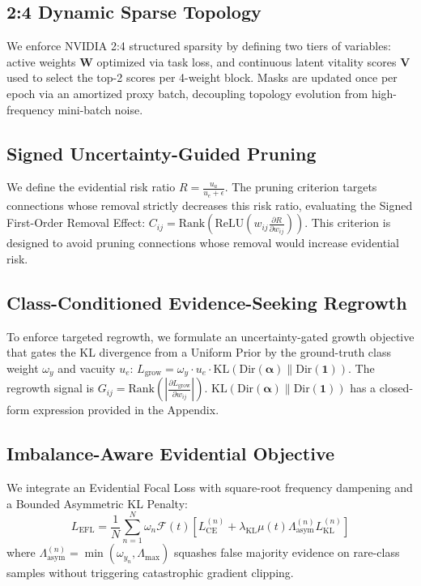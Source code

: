 \documentclass[letterpaper]{article} %
\begin{document}
\subsection{2:4 Dynamic Sparse Topology}
We enforce NVIDIA 2:4 structured sparsity by defining two tiers of variables: active weights $\bm{W}$ optimized via task loss, and continuous latent vitality scores $\bm{V}$ used to select the top-2 scores per 4-weight block. Masks are updated once per epoch via an amortized proxy batch, decoupling topology evolution from high-frequency mini-batch noise.

\subsection{Signed Uncertainty-Guided Pruning}
We define the evidential risk ratio $R = \frac{u_a}{u_e + \epsilon}$. The pruning criterion targets connections whose removal strictly decreases this risk ratio, evaluating the Signed First-Order Removal Effect: $C_{ij} = \text{Rank}(\text{ReLU}(w_{ij} \frac{\partial R}{\partial w_{ij}}))$. This criterion is designed to avoid pruning connections whose removal would increase evidential risk.

\subsection{Class-Conditioned Evidence-Seeking Regrowth}
To enforce targeted regrowth, we formulate an uncertainty-gated growth objective that gates the KL divergence from a Uniform Prior by the ground-truth class weight $\omega_y$ and vacuity $u_e$: $L_{\text{grow}} = \omega_y \cdot u_e \cdot \text{KL}(\text{Dir}(\bm{\alpha}) \parallel \text{Dir}(\mathbf{1}))$. The regrowth signal is $G_{ij} = \text{Rank}(|\frac{\partial L_{\text{grow}}}{\partial w_{ij}}|)$. $\text{KL}(\text{Dir}(\bm{\alpha}) \parallel \text{Dir}(\mathbf{1}))$ has a closed-form expression provided in the Appendix.

\subsection{Imbalance-Aware Evidential Objective}
We integrate an Evidential Focal Loss with square-root frequency dampening and a Bounded Asymmetric KL Penalty:
\begin{equation}
    L_{\text{EFL}} = \frac{1}{N} \sum_{n=1}^N \omega_n \mathcal{F}(t) \left[ L_{\text{CE}}^{(n)} + \lambda_{\text{KL}} \mu(t) \Lambda_{\text{asym}}^{(n)} L_{\text{KL}}^{(n)} \right]
\end{equation}
where $\Lambda_{\text{asym}}^{(n)} = \min(\omega_{y_n}, \Lambda_{\text{max}})$ squashes false majority evidence on rare-class samples without triggering catastrophic gradient clipping. 
\end{document}
